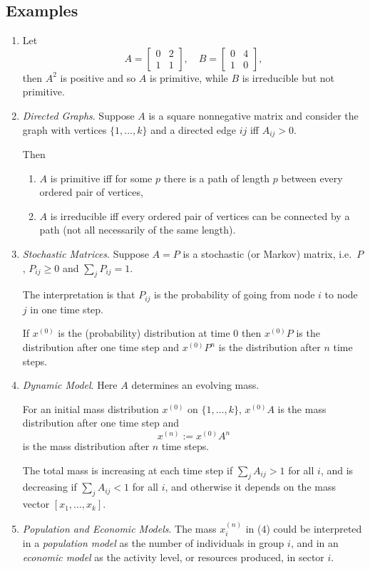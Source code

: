 \documentclass[a4paper]{amsart}
\theoremstyle{plain}
\theoremstyle{definition}
\theoremstyle{remark}
\begin{document}
\subsection{Examples}\mbox{}
\begin{enumerate}
 
\item Let
\[
A=\begin{bmatrix}0&2\\1&1 \end{bmatrix}, \quad B=  \begin{bmatrix}0&4\\1&0 \end{bmatrix},
\]
then $ A^2 $ is positive and so $ A $ is primitive, while $ B $ is irreducible but not primitive.
  

\item \emph{Directed Graphs}.
Suppose $ A $ is a square nonnegative matrix and consider the graph with vertices $ \{1,\dots, k\} $  and a directed edge  $ ij $ iff $ A_{ij}>0 $.  

Then 
\begin{enumerate}

\item $ A $ is primitive iff for some $ p $ there is a path of length $ p $ between every ordered pair of vertices,
\item $ A $ is irreducible iff every ordered pair of vertices can be connected by a path (not all necessarily of the same length).
\end{enumerate} 

\item \emph{Stochastic Matrices}.  Suppose $ A=P $ is a stochastic (or Markov) matrix, i.e.\  $ P $, $ P_{ij}\geq 0 $ and $ \sum_j P_{ij} =1 $.   

The interpretation is that $ P_{ij} $ is the probability of going from node $ i $ to node $ j $ in one time step.  
 
 If $ x^{(0)} $ is the (probability) distribution at time $ 0 $ then $ x^{(0)}P $ is the distribution after one time step   and $ x^{(0)} P^n $ is the  distribution after $ n $  time steps.

\item \emph{Dynamic   Model}.  Here $ A $ determines an evolving mass.

For an  initial mass distribution $  x^{(0)} $ on $ \{1,\dots, k\} $, $ x^{(0)}A $ is the mass distribution after one time step   and 
\[
x^{(n)} :=  x^{(0)} A^n 
\]
 is the   mass distribution after $ n $  time steps.  

The total mass    is increasing at each time step  if $ \sum_j A_{ij} > 1 $ for all $i $, and is decreasing if  $ \sum_j A_{ij} < 1 $ for all $i $, and otherwise it depends on the mass vector $ [x_1,\dots, x_k] $. 

\item \emph{Population and Economic Models}. The mass $ x^{(n)}_i$ in (4) could be interpreted in a \emph{population model} as the number of individuals in group $ i $, and in an \emph{economic model} as the activity level, or resources produced, in sector $ i $.
\end{enumerate} 
 
\end{document}
